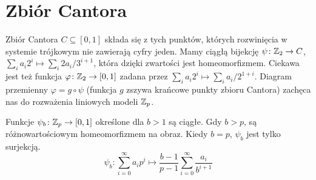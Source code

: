 \section{Zbiór Cantora}
Zbiór Cantora $C \subseteq [0,1]$ składa się z tych punktów, których rozwinięcia w systemie trójkowym nie zawierają cyfry jeden.
Mamy ciągłą bijekcję $\psi \colon \mathbb Z_2 \to C$, $\sum_i a_i2^i \mapsto \sum_i 2a_i/3^{i+1}$, która dzięki zwartości jest homeomorfizmem.
Ciekawa jest też funkcja $\varphi \colon \mathbb Z_2 \to [0,1]$ zadana przez $\sum_i a_i2^i \mapsto \sum_i a_i/2^{1+i}$.
Diagram przemienny $\varphi = g \circ \psi$ (funkcja $g$ zszywa krańcowe punkty zbioru Cantora) zachęca nas do rozważenia liniowych modeli $\mathbb Z_p$.

\begin{fakt}
	Funkcje $\psi_b \colon \mathbb Z_p \to [0,1]$ określone dla $b > 1$ są ciągłe.
	Gdy $b > p$, są różnowartościowym homeomorfizmem na obraz.
	Kiedy $b = p$, $\psi_b$ jest tylko surjekcją.
	\[
		\psi_b \colon \sum_{i = 0}^\infty a_i p^i \mapsto \frac {b - 1 }{p-1} \sum_{i = 0}^\infty \frac{a_i}{b^{i+1}}
	\]
\end{fakt}
